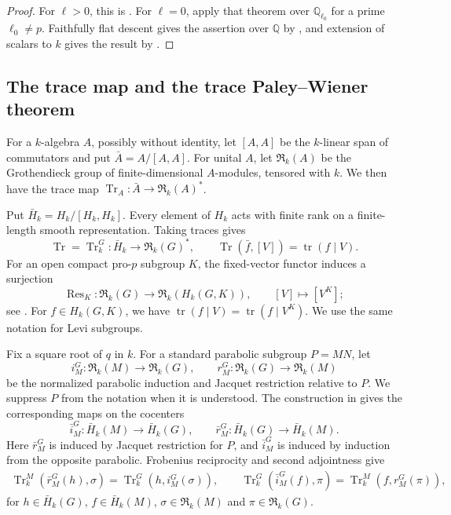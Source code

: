 \documentclass[11pt,letterpaper]{amsart}
\theoremstyle{definition}
\numberwithin{equation}{section}
\numberwithin{theorem}{section}
\newcommand{\kk}{k}
\newcommand{\QQ}{\mathbb Q}
\newcommand{\cR}{\mathfrak R}
\DeclareMathOperator{\Tr}{Tr}
\DeclareMathOperator{\tr}{tr}
\DeclareMathOperator{\Res}{Res}
\begin{document}
\begin{proof}
For $\ell>0$, this is \cite[Theorem~1.1]{DHKM}.
For $\ell=0$, apply that theorem over $\mathbb Q_{\ell_0}$
for a prime $\ell_0\ne p$. Faithfully flat descent gives
the assertion over $\QQ$ by \cite[Lemma~3.3(2)]{DHKM},
and extension of scalars to $\kk$ gives the result by
\cite[Lemma~3.3(1)]{DHKM}.
\end{proof}

\subsection{The trace map and the trace Paley--Wiener theorem}
\label{subsec:trace}

For a $\kk$-algebra $A$, possibly without identity,
let $[A,A]$ be the $\kk$-linear span of commutators and
put $\bar A=A/[A,A]$. For unital $A$, let $\cR_\kk(A)$ be
the Grothendieck group of finite-dimensional
$A$-modules, tensored with $\kk$. We then have the trace map
$\Tr_A:\bar A\to\cR_\kk(A)^*$.

Put $\bar H_\kk=H_\kk/[H_\kk,H_\kk]$.
Every element of $H_\kk$ acts with finite rank on a finite-length smooth representation. Taking traces gives
\[
 \Tr=\Tr_\kk^G:\bar H_\kk\longrightarrow\cR_\kk(G)^*,
 \qquad \Tr(\bar f,[V])=\tr(f\mid V).
\]
For an open compact pro-$p$ subgroup $K$, the fixed-vector
functor induces a surjection
\[
 \Res_K:\cR_\kk(G)\longrightarrow\cR_\kk(H_\kk(G,K)),
 \qquad [V]\longmapsto[V^K];
\]
see \cite[Theorem~3.2]{HV}.
For $f\in H_\kk(G,K)$, we have
$\tr(f\mid V)=\tr(f\mid V^K)$.
We use the same notation for Levi subgroups.

Fix a square root of $q$ in $\kk$. For a standard parabolic subgroup $P=MN$, let
\[
 i_M^G:\cR_\kk(M)\longrightarrow\cR_\kk(G),\qquad
 r_M^G:\cR_\kk(G)\longrightarrow\cR_\kk(M)
\]
be the normalized parabolic induction and Jacquet restriction
relative to $P$. We suppress $P$ from the notation when
it is understood. The construction in \cite[\S2.2]{CHIII} gives the corresponding maps on the cocenters
\[
 \bar i_M^G:\bar H_\kk(M)\longrightarrow\bar H_\kk(G),\qquad
 \bar r_M^G:\bar H_\kk(G)\longrightarrow\bar H_\kk(M).
\]
Here $\bar r_M^G$ is induced by Jacquet restriction for $P$, and $\bar i_M^G$ is induced by induction from the opposite parabolic. Frobenius reciprocity and second adjointness \cite[Corollary~1.3]{DHKM} give 
\[
 \begin{aligned}
 \Tr_\kk^M(\bar r_M^G(h),\sigma)
   =\Tr_\kk^G(h,i_M^G(\sigma)),\qquad
 \Tr_\kk^G(\bar i_M^G(f),\pi)
   =\Tr_\kk^M(f,r_M^G(\pi)),
 \end{aligned}
\]
for $h\in\bar H_\kk(G)$, $f\in\bar H_\kk(M)$,
$\sigma\in\cR_\kk(M)$ and $\pi\in\cR_\kk(G)$.
\end{document}

